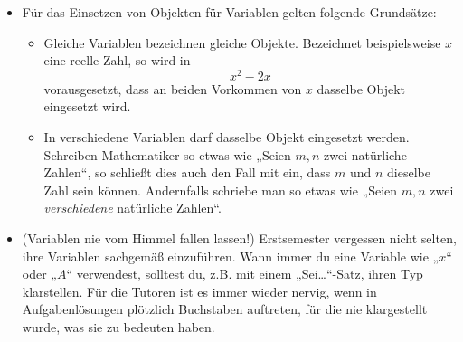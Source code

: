 \begin{bem} \quad
    \begin{itemize}
        \item Für das Einsetzen von Objekten für Variablen gelten folgende Grundsätze:
        \begin{itemize}
            \item Gleiche Variablen bezeichnen gleiche Objekte. Bezeichnet beispielsweise $x$ eine reelle Zahl, so wird in
                \[ x^2-2x \]
            vorausgesetzt, dass an beiden Vorkommen von $x$ dasselbe Objekt eingesetzt wird.
            \item In verschiedene Variablen darf dasselbe Objekt eingesetzt werden. Schreiben Mathematiker so etwas wie „Seien $m,n$ zwei natürliche Zahlen“, so schließt dies auch den Fall mit ein, dass $m$ und $n$ dieselbe Zahl sein können. Andernfalls schriebe man so etwas wie „Seien $m,n$ zwei \emph{verschiedene} natürliche Zahlen“.
        \end{itemize}
        \item(Variablen nie vom Himmel fallen lassen!) Erstsemester vergessen nicht selten, ihre Variablen sachgemäß einzuführen. Wann immer du eine Variable wie „$x$“ oder „$A$“ verwendest, solltest du, z.B. mit einem „Sei\dots“-Satz, ihren Typ klarstellen. Für die Tutoren ist es immer wieder nervig, wenn in Aufgabenlösungen plötzlich Buchstaben auftreten, für die nie klargestellt wurde, was sie zu bedeuten haben.
    \end{itemize}
\end{bem}


